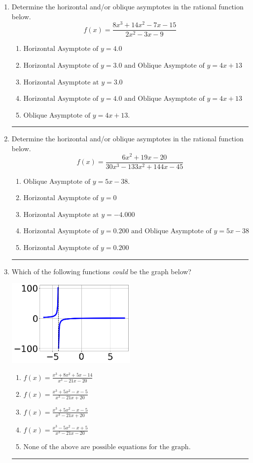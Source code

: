 \documentclass[14pt]{extbook}
\newcommand{\litem}[1]{\item#1\hspace*{-1cm}\rule{\textwidth}{0.4pt}}
\begin{document}
\begin{enumerate}
\litem{
Determine the horizontal and/or oblique asymptotes in the rational function below.\[ f(x) = \frac{8x^{3} +14 x^{2} -7 x -15}{2x^{2} -3 x -9} \]\begin{enumerate}[label=\Alph*.]
\item \( \text{Horizontal Asymptote of } y = 4.0  \)
\item \( \text{Horizontal Asymptote of } y = 3.0 \text{ and Oblique Asymptote of } y = 4x + 13 \)
\item \( \text{Horizontal Asymptote at } y = 3.0 \)
\item \( \text{Horizontal Asymptote of } y = 4.0 \text{ and Oblique Asymptote of } y = 4x + 13 \)
\item \( \text{Oblique Asymptote of } y = 4x + 13. \)

\end{enumerate} }
\litem{
Determine the horizontal and/or oblique asymptotes in the rational function below.\[ f(x) = \frac{6x^{2} +19 x -20}{30x^{3} -133 x^{2} +144 x -45} \]\begin{enumerate}[label=\Alph*.]
\item \( \text{Oblique Asymptote of } y = 5x -38. \)
\item \( \text{Horizontal Asymptote of } y = 0 \)
\item \( \text{Horizontal Asymptote at } y = -4.000 \)
\item \( \text{Horizontal Asymptote of } y = 0.200 \text{ and Oblique Asymptote of } y = 5x -38 \)
\item \( \text{Horizontal Asymptote of } y = 0.200  \)

\end{enumerate} }
\litem{
Which of the following functions \textit{could} be the graph below?
\begin{center}
    \includegraphics[width=0.5\textwidth]{../Figures/identifyGraphOfRationalFunctionB.png}
\end{center}
\begin{enumerate}[label=\Alph*.]
\item \( f(x)=\frac{x^{3} +8 x^{2} +5 x -14}{x^{3} -21 x -20} \)
\item \( f(x)=\frac{x^{3} +5 x^{2} -x -5}{x^{3} -21 x + 20} \)
\item \( f(x)=\frac{x^{3} +5 x^{2} -x -5}{x^{3} -21 x + 20} \)
\item \( f(x)=\frac{x^{3} -5 x^{2} -x + 5}{x^{3} -21 x -20} \)
\item \( \text{None of the above are possible equations for the graph.} \)


\end{enumerate}}
\end{enumerate}
\end{document}
